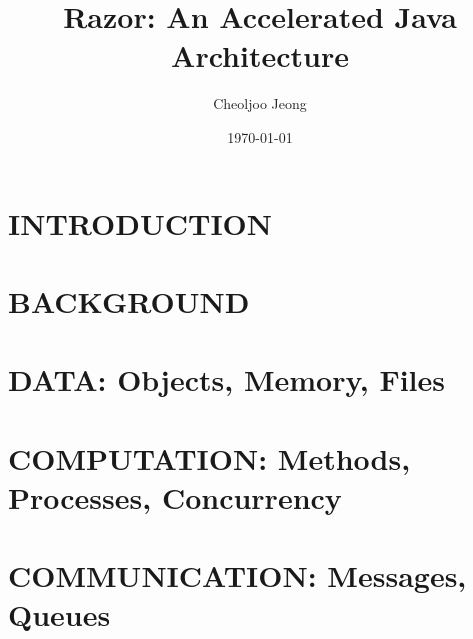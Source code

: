 \documentclass{report}
\begin{document}
\title{\Huge\bf Razor: An Accelerated Java Architecture}
\author{\Large Cheoljoo Jeong}
\date{\Large \today}
\maketitle

\tableofcontents

\part{INTRODUCTION}



\part{BACKGROUND}






\part{DATA: Objects, Memory, Files}






\part{COMPUTATION: Methods, Processes, Concurrency}


\part{COMMUNICATION: Messages, Queues}






\nocite{LY99,SM01,AGH06}
\end{document}
